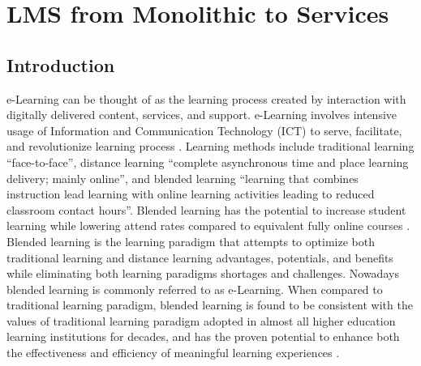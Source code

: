 \documentclass[12pt,a4paper,final,twoside,onecolumn,titlepage]{book}
\begin{document}
\chapter{LMS from Monolithic to Services}
\label{LMSFromMonolothicToServices}
\section{Introduction}
e-Learning can be thought of as the learning process created by interaction with digitally delivered content, services, and support. e-Learning involves intensive usage of Information and Communication Technology (ICT) to serve, facilitate, and revolutionize learning process \cite{R01, R02, R03}. Learning methods include traditional learning “face-to-face”, distance learning “complete asynchronous time and place learning delivery; mainly online”, and blended learning “learning that combines instruction lead learning with online learning activities leading to reduced classroom contact hours”. Blended learning has the potential to increase student learning while lowering attend rates compared to equivalent fully online courses \cite{R04}. Blended learning is the learning paradigm that attempts to optimize both traditional learning and distance learning advantages, potentials, and benefits while eliminating both learning paradigms shortages and challenges. Nowadays blended learning is commonly referred to as e-Learning. When compared to traditional learning paradigm, blended learning is found to be consistent with the values of traditional learning paradigm adopted in almost all higher education learning institutions for decades, and has the proven potential to enhance both the effectiveness and efficiency of meaningful learning experiences \cite{R05}.
\end{document}
